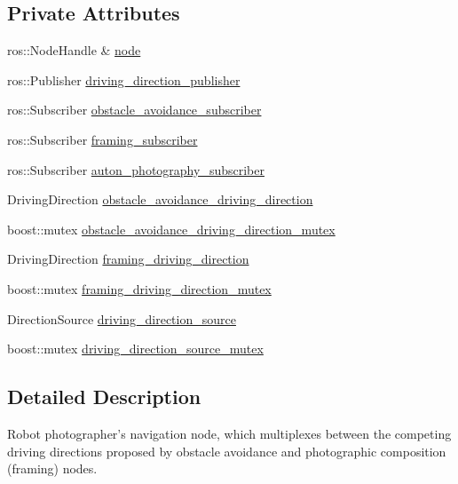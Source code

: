 \subsection*{\-Private \-Attributes}
\begin{DoxyCompactItemize}
\item 
ros\-::\-Node\-Handle \& \hyperlink{class_r_p_navigation_node_aed678dff310085f48bed11c3a0daaacc}{node}
\item 
ros\-::\-Publisher \hyperlink{class_r_p_navigation_node_a9bcecec9c0cb1889d8d686709d6096c6}{driving\-\_\-direction\-\_\-publisher}
\item 
ros\-::\-Subscriber \hyperlink{class_r_p_navigation_node_ae03e8685753a6526a06b9c5eac41248d}{obstacle\-\_\-avoidance\-\_\-subscriber}
\item 
ros\-::\-Subscriber \hyperlink{class_r_p_navigation_node_a3f09a98d40e698636c02f3ad915d91cf}{framing\-\_\-subscriber}
\item 
ros\-::\-Subscriber \hyperlink{class_r_p_navigation_node_aaed3d3ee903119f2caad3eef70a95aa1}{auton\-\_\-photography\-\_\-subscriber}
\item 
\-Driving\-Direction \hyperlink{class_r_p_navigation_node_a4ff70f55e413132242e1fbc433922a03}{obstacle\-\_\-avoidance\-\_\-driving\-\_\-direction}
\item 
boost\-::mutex \hyperlink{class_r_p_navigation_node_a21ecb936c90af84373c6f831c2ccb05b}{obstacle\-\_\-avoidance\-\_\-driving\-\_\-direction\-\_\-mutex}
\item 
\-Driving\-Direction \hyperlink{class_r_p_navigation_node_a145cb04c28b99dadb0cfcbd20fa59704}{framing\-\_\-driving\-\_\-direction}
\item 
boost\-::mutex \hyperlink{class_r_p_navigation_node_a0345dfb701ca4033a46e7aff5dafe577}{framing\-\_\-driving\-\_\-direction\-\_\-mutex}
\item 
\-Direction\-Source \hyperlink{class_r_p_navigation_node_a5be6ceeeddc7cbee6d66ad54608a6973}{driving\-\_\-direction\-\_\-source}
\item 
boost\-::mutex \hyperlink{class_r_p_navigation_node_a8749c19ec480ac228295b86fa2562ef4}{driving\-\_\-direction\-\_\-source\-\_\-mutex}
\end{DoxyCompactItemize}


\subsection{\-Detailed \-Description}
\-Robot photographer's navigation node, which multiplexes between the competing driving directions proposed by obstacle avoidance and photographic composition (framing) nodes. 

